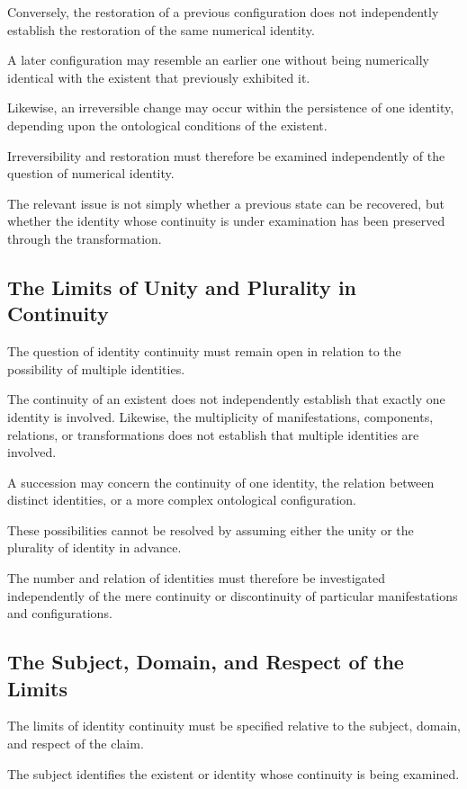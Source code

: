 Conversely, the restoration of a previous configuration
does not independently establish the restoration
of the same numerical identity.

A later configuration may resemble an earlier
one without being numerically identical with
the existent that previously exhibited it.

Likewise, an irreversible change may occur within
the persistence of one identity, depending upon
the ontological conditions of the existent.

Irreversibility and restoration must therefore
be examined independently of the question of
numerical identity.

The relevant issue is not simply whether a previous
state can be recovered, but whether the identity
whose continuity is under examination has been
preserved through the transformation.

\subsection{The Limits of Unity and Plurality in Continuity}

The question of identity continuity must remain
open in relation to the possibility of multiple
identities.

The continuity of an existent does not independently
establish that exactly one identity is involved.
Likewise, the multiplicity of manifestations,
components, relations, or transformations does
not establish that multiple identities are involved.

A succession may concern the continuity of one
identity, the relation between distinct identities,
or a more complex ontological configuration.

These possibilities cannot be resolved by assuming
either the unity or the plurality of identity
in advance.

The number and relation of identities must therefore
be investigated independently of the mere continuity
or discontinuity of particular manifestations
and configurations.

\subsection{The Subject, Domain, and Respect of the Limits}

The limits of identity continuity must be specified
relative to the subject, domain, and respect of
the claim.

The subject identifies the existent or identity
whose continuity is being examined.

